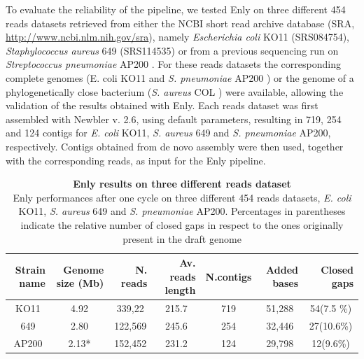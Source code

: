 To evaluate the reliability of the pipeline, we tested Enly on three different 454 reads datasets retrieved from either the NCBI short read archive database (SRA, \href{http://www.ncbi.nlm.nih.gov/sra}{http://www.ncbi.nlm.nih.gov/sra}), namely \textit{Escherichia coli} KO11 (SRS084754), \textit{Staphylococcus aureus} 649 (SRS114535) or from a previous sequencing run on \textit{Streptococcus pneumoniae} AP200 \cite{romina11complete}. For these reads datasets the corresponding complete genomes (E. coli KO11 and \textit{S. pneumoniae} AP200 \cite{romina11complete}\cite{turner2012optical}) or the genome of a phylogenetically close bacterium (\textit{S. aureus} COL \cite{gill2005insights}) were available, allowing the validation of the results obtained with Enly. Each reads dataset was first assembled with Newbler v. 2.6, using default parameters, resulting in 719, 254 and 124 contigs for \textit{E. coli} KO11, \textit{S. aureus} 649 and \textit{S. pneumoniae} AP200, respectively. Contigs obtained from de novo assembly were then used, together with the corresponding reads, as input for the Enly pipeline.

\begin{table}
  \centering
    \begin{tabular}{rrrrrrr}
    \toprule
    Strain name & Genome size (Mb) & N.  reads & Av. reads length & N.contigs & Added bases & Closed gaps \\
    \midrule
    \multicolumn{1}{c}{KO11} & \multicolumn{1}{c}{4.92} & \multicolumn{1}{c}{339,22} & \multicolumn{1}{c}{215.7} & \multicolumn{1}{c}{719} & \multicolumn{1}{c}{51,288} & \multicolumn{1}{c}{54(7.5 \%)} \\
    \multicolumn{1}{c}{649} & \multicolumn{1}{c}{2.80} & \multicolumn{1}{c}{122,569} & \multicolumn{1}{c}{245.6} & \multicolumn{1}{c}{254} & \multicolumn{1}{c}{32,446} & \multicolumn{1}{c}{27(10.6\%)} \\
    \multicolumn{1}{c}{AP200} & \multicolumn{1}{c}{2.13*} & \multicolumn{1}{c}{152,452} & \multicolumn{1}{c}{231.2} & \multicolumn{1}{c}{124} & \multicolumn{1}{c}{29,798} & \multicolumn{1}{c}{12(9.6\%)} \\
    \bottomrule
    \end{tabular}%
  \caption{\textbf{Enly results on three different reads dataset}\\
  		Enly performances after one cycle on three different 454 reads datasets, \textit{E. coli} KO11, \textit{S. aureus} 649 and \textit{S. pneumoniae} AP200. Percentages in parentheses indicate the relative number of closed gaps in respect to the ones originally present in the draft genome}
  \label{tab:enly}%
\end{table}%

